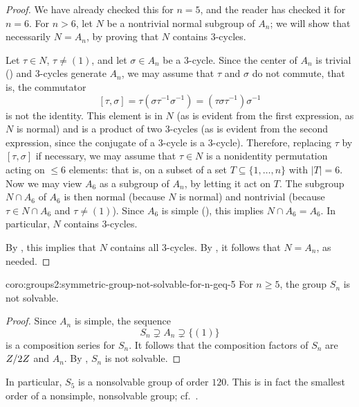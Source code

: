\begin{proof}
  We have already checked this for $n = 5$, and the reader has checked
  it for $n = 6$. For $n > 6$, let $N$ be a nontrivial normal subgroup
  of $A_n$; we will show that necessarily $N = A_n$, by proving that
  $N$ contains $3$-cycles.

  Let $\tau \in N$, $\tau \neq (1)$, and let $\sigma \in A_n$ be a
  $3$-cycle.  Since the center of $A_n$ is trivial
  () and $3$-cycles
  generate $A_n$, we may assume that $\tau$ and $\sigma$ do not
  commute, that is, the commutator
  \[ [\tau, \sigma] = \tau(\sigma\tau^{-1}\sigma^{-1}) =
    (\tau\sigma\tau^{-1})\sigma^{-1}
  \]
  is not the identity. This element is in $N$ (as is evident from the
  first expression, as $N$ is normal) and is a product of two
  $3$-cycles (as is evident from the second expression, since the
  conjugate of a $3$-cycle is a $3$-cycle).  Therefore, replacing
  $\tau$ by $[\tau, \sigma]$ if necessary, we may assume that
  $\tau \in N$ is a nonidentity permutation acting on $\leq 6$
  elements: that is, on a subset of a set $T \subseteq \{1,\dots,n\}$
  with $|T| = 6$.  Now we may view $A_6$ as a subgroup of $A_n$, by
  letting it act on $T$. The subgroup $N \cap A_6$ of $A_6$ is then
  normal (because $N$ is normal) and nontrivial (because
  $\tau \in N \cap A_6$ and $\tau \neq (1)$). Since $A_6$ is simple
  (), this
  implies $N \cap A_6 = A_6$.  In particular, $N$ contains $3$-cycles.

  By , this implies that
  $N$ contains all $3$-cycles. By , it
  follows that $N = A_n$, as needed.
\end{proof}
\begin{coro}{}{coro:groups2:symmetric-group-not-solvable-for-n-geq-5}
  For $n \geq 5$, the group $S_n$ is not solvable.
\end{coro}

\begin{proof}
  Since $A_n$ is simple, the sequence
  \[
    S_n \supsetneq A_n \supsetneq \{(1)\}
  \]
  is a composition series for $S_n$. It follows that the composition
  factors of $S_n$ are $Z/2Z$ and $A_n$. By
  , $S_n$ is not solvable.
\end{proof}

In particular, $S_5$ is a nonsolvable group of order $120$. This is in
fact the smallest order of a nonsimple, nonsolvable group; cf.\
.

